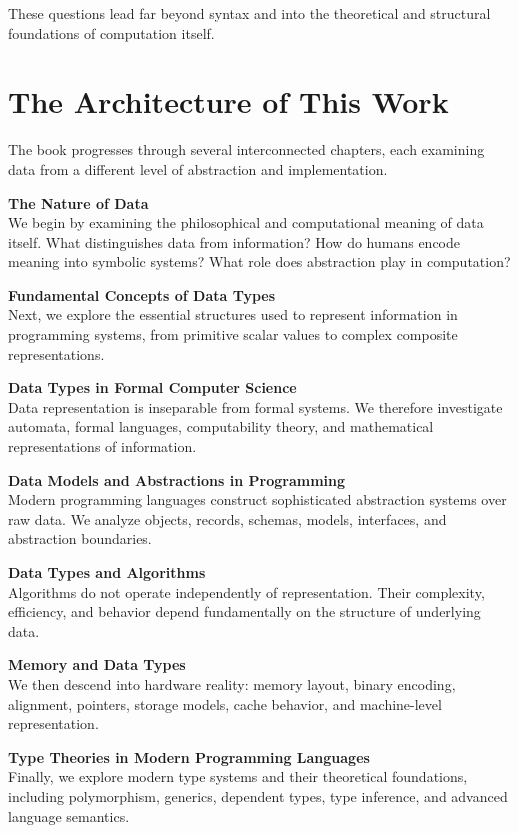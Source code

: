 These questions lead far beyond syntax and into the theoretical and structural foundations of computation itself.

\section*{The Architecture of This Work}

The book progresses through several interconnected chapters, each examining data from a different level of abstraction and implementation.

\textbf{The Nature of Data}\\
We begin by examining the philosophical and computational meaning of data itself. What distinguishes data from information? How do humans encode meaning into symbolic systems? What role does abstraction play in computation?

\textbf{Fundamental Concepts of Data Types}\\
Next, we explore the essential structures used to represent information in programming systems, from primitive scalar values to complex composite representations.

\textbf{Data Types in Formal Computer Science}\\
Data representation is inseparable from formal systems. We therefore investigate automata, formal languages, computability theory, and mathematical representations of information.

\textbf{Data Models and Abstractions in Programming}\\
Modern programming languages construct sophisticated abstraction systems over raw data. We analyze objects, records, schemas, models, interfaces, and abstraction boundaries.

\textbf{Data Types and Algorithms}\\
Algorithms do not operate independently of representation. Their complexity, efficiency, and behavior depend fundamentally on the structure of underlying data.

\textbf{Memory and Data Types}\\
We then descend into hardware reality: memory layout, binary encoding, alignment, pointers, storage models, cache behavior, and machine-level representation.

\textbf{Type Theories in Modern Programming Languages}\\
Finally, we explore modern type systems and their theoretical foundations, including polymorphism, generics, dependent types, type inference, and advanced language semantics.


